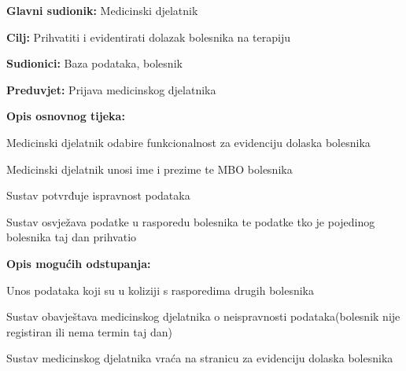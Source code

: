 		\noindent {}
		\begin{packed_item}
			
			\item \textbf{Glavni sudionik: }Medicinski djelatnik
			\item  \textbf{Cilj:} Prihvatiti i evidentirati dolazak bolesnika na terapiju
			\item  \textbf{Sudionici:} Baza podataka, bolesnik
			\item  \textbf{Preduvjet:} Prijava medicinskog djelatnika
			\item  \textbf{Opis osnovnog tijeka:}
			
			
			\item[] \begin{packed_enum}
				
				\item Medicinski djelatnik odabire funkcionalnost za evidenciju dolaska bolesnika
				\item Medicinski djelatnik unosi ime i prezime te MBO bolesnika
				\item Sustav potvrđuje ispravnost podataka
				\item Sustav osvježava podatke u rasporedu bolesnika te podatke tko je pojedinog bolesnika taj dan prihvatio
				
			\end{packed_enum}
			
			\item  \textbf{Opis mogućih odstupanja:}
			\item[2.a] Unos podataka koji su u koliziji s rasporedima drugih bolesnika
			\item[] \begin{packed_enum}
				
				\item Sustav obavještava medicinskog djelatnika o neispravnosti podataka(bolesnik nije registiran ili nema termin taj dan)
				\item Sustav medicinskog djelatnika vraća na stranicu za evidenciju dolaska bolesnika
				
				
				
			\end{packed_enum}
		\end{packed_item}
	
